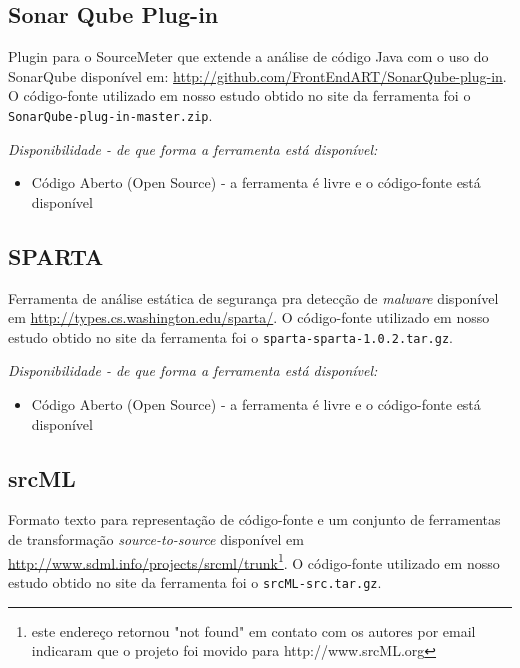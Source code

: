 \subsection{Sonar Qube Plug-in}

Plugin para o SourceMeter que extende a análise de
código Java com o uso do SonarQube disponível em:
\url{http://github.com/FrontEndART/SonarQube-plug-in}. O código-fonte
utilizado em nosso estudo obtido no site da ferramenta foi o
\texttt{SonarQube-plug-in-master.zip}.

\begin{description}

  \item {\it Disponibilidade - de que forma a ferramenta está disponível:}
    \begin{itemize}
      \item Código Aberto (Open Source) - a ferramenta é livre e o código-fonte está disponível
    \end{itemize}

\end{description}

\subsection{SPARTA}

Ferramenta de análise estática de segurança pra detecção de {\it
malware} disponível em
\url{http://types.cs.washington.edu/sparta/}. O código-fonte utilizado em nosso
estudo obtido no site da ferramenta foi o \texttt{sparta-sparta-1.0.2.tar.gz}.

\begin{description}

  \item {\it Disponibilidade - de que forma a ferramenta está disponível:}
    \begin{itemize}
      \item Código Aberto (Open Source) - a ferramenta é livre e o código-fonte está disponível
    \end{itemize}

\end{description}

\subsection{srcML}

Formato texto para representação de código-fonte e um conjunto de
ferramentas de transformação {\it source-to-source} disponível em
\url{http://www.sdml.info/projects/srcml/trunk}\footnote{este endereço
retornou "not found" em contato com os autores por email indicaram que o
projeto foi movido para http://www.srcML.org}. O código-fonte utilizado em
nosso estudo obtido no site da ferramenta foi o \texttt{srcML-src.tar.gz}.

